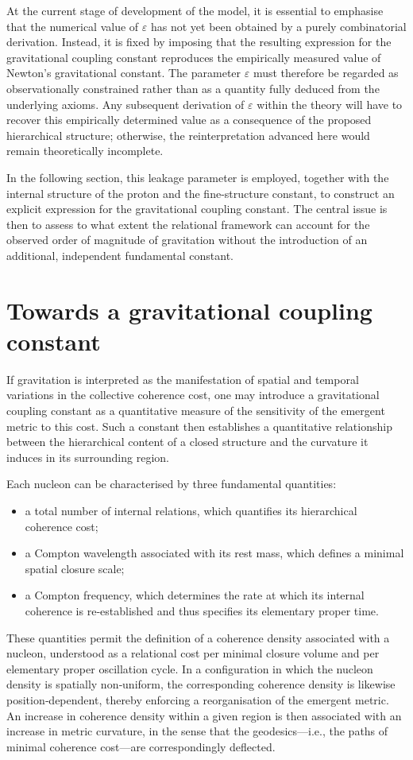 \documentclass[11pt,a4paper]{article}
\begin{document}
At the current stage of development of the model, it is essential to emphasise that the numerical value of \(\varepsilon\) has not yet been obtained by a purely combinatorial derivation. Instead, it is fixed by imposing that the resulting expression for the gravitational coupling constant reproduces the empirically measured value of Newton’s gravitational constant. The parameter \(\varepsilon\) must therefore be regarded as observationally constrained rather than as a quantity fully deduced from the underlying axioms. Any subsequent derivation of \(\varepsilon\) within the theory will have to recover this empirically determined value as a consequence of the proposed hierarchical structure; otherwise, the reinterpretation advanced here would remain theoretically incomplete.

In the following section, this leakage parameter is employed, together with the internal structure of the proton and the fine-structure constant, to construct an explicit expression for the gravitational coupling constant. The central issue is then to assess to what extent the relational framework can account for the observed order of magnitude of gravitation without the introduction of an additional, independent fundamental constant.

\section{Towards a gravitational coupling constant}
If gravitation is interpreted as the manifestation of spatial and temporal variations in the collective coherence cost, one may introduce a gravitational coupling constant as a quantitative measure of the sensitivity of the emergent metric to this cost. Such a constant then establishes a quantitative relationship between the hierarchical content of a closed structure and the curvature it induces in its surrounding region. 

Each nucleon can be characterised by three fundamental quantities:
\begin{itemize}[label=-]
  \item a total number of internal relations, which quantifies its hierarchical coherence cost;
  \item a Compton wavelength associated with its rest mass, which defines a minimal spatial closure scale;
  \item a Compton frequency, which determines the rate at which its internal coherence is re‑established and thus specifies its elementary proper time.
\end{itemize}
These quantities permit the definition of a coherence density associated with a nucleon, understood as a relational cost per minimal closure volume and per elementary proper oscillation cycle. In a configuration in which the nucleon density is spatially non‑uniform, the corresponding coherence density is likewise position‑dependent, thereby enforcing a reorganisation of the emergent metric. An increase in coherence density within a given region is then associated with an increase in metric curvature, in the sense that the geodesics—i.e., the paths of minimal coherence cost—are correspondingly deflected.
\end{document}
